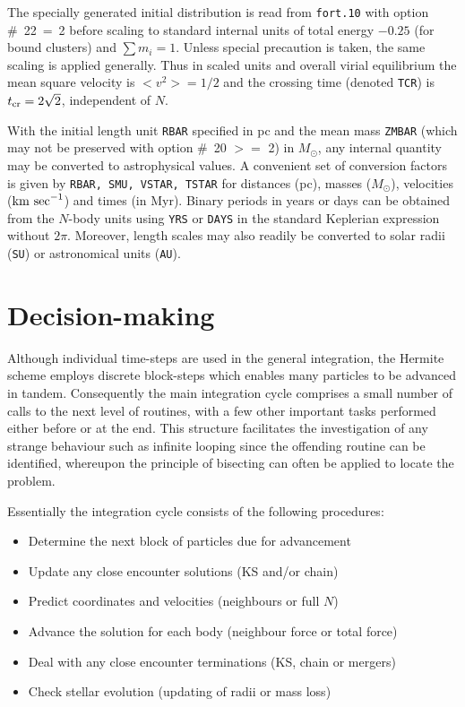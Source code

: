 \documentclass[12pt]{article}
\begin{document}
The specially generated initial distribution is read from {\tt fort.10} with
option \#~22~=~2 before scaling to standard internal units of total energy
$-0.25$ (for bound clusters) and $\sum m_i = 1$.
Unless special precaution is taken, the same scaling is applied generally.
Thus in scaled units and overall virial equilibrium the mean square velocity
is $<v^2> = 1/2$ and the crossing time (denoted {\tt TCR}) is
$t_{\rm cr} = 2 \sqrt 2$, independent of $N$.

With the initial length unit {\tt RBAR} specified in pc and the mean mass
{\tt ZMBAR} (which may not be preserved with option \#~20 $>=$ 2) in
$M_{\odot}$, any internal quantity may be converted to astrophysical values.
A convenient set of conversion factors is given by
{\tt RBAR, SMU, VSTAR, TSTAR} for distances (pc), masses
($M_{\odot}$), velocities (${\rm km~sec}^{-1}$) and times (in Myr).
Binary periods in years or days can be obtained from the $N$-body units
using {\tt YRS} or {\tt DAYS} in the standard Keplerian expression without
$2 \pi$.
Moreover, length scales may also readily be converted to solar radii
({\tt SU}) or astronomical units ({\tt AU}).

\section{Decision-making}

Although individual time-steps are used in the general integration, the 
Hermite scheme employs discrete block-steps which enables many particles to
be advanced in tandem.
Consequently the main integration cycle comprises a small number of calls
to the next level of routines, with a few other important tasks performed
either before or at the end.
This structure facilitates the investigation of any strange behaviour such
as infinite looping since the offending routine can be identified, whereupon
the principle of bisecting can often be applied to locate the problem.

Essentially the integration cycle consists of the following procedures:

\begin{itemize}
\item Determine the next block of particles due for advancement
\item Update any close encounter solutions (KS and/or chain)
\item Predict coordinates and velocities (neighbours or full $N$)
\item Advance the solution for each body (neighbour force or total force)
\item Deal with any close encounter terminations (KS, chain or mergers)
\item Check stellar evolution (updating of radii or mass loss)
\end{itemize}
\end{document}
